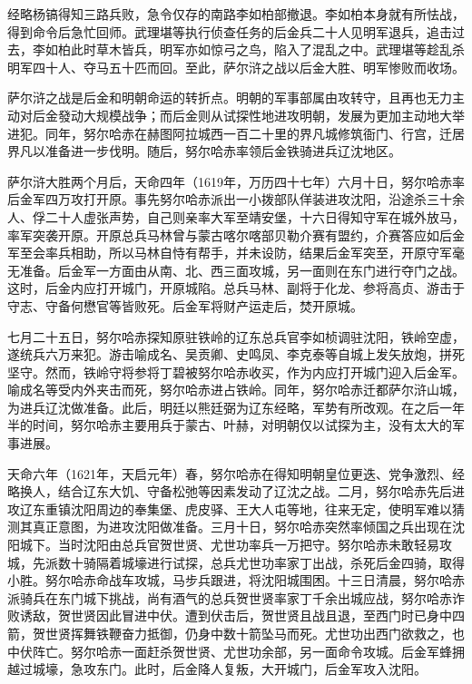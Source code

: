经略杨镐得知三路兵败，急令仅存的南路李如柏部撤退。李如柏本身就有所怯战，得到命令后急忙回师。武理堪等执行侦查任务的后金兵二十人见明军退兵，追击过去，李如柏此时草木皆兵，明军亦如惊弓之鸟，陷入了混乱之中。武理堪等趁乱杀明军四十人、夺马五十匹而回。至此，萨尔浒之战以后金大胜、明军惨败而收场。

萨尔浒之战是后金和明朝命运的转折点。明朝的军事部属由攻转守，且再也无力主动对后金發动大规模战争；而后金则从试探性地进攻明朝，发展为更加主动地大举进犯。同年，努尔哈赤在赫图阿拉城西一百二十里的界凡城修筑衙门、行宫，迁居界凡以准备进一步伐明。随后，努尔哈赤率领后金铁骑进兵辽沈地区。

萨尔浒大胜两个月后，天命四年（1619年，万历四十七年）六月十日，努尔哈赤率后金军四万攻打开原。事先努尔哈赤派出一小拨部队佯装进攻沈阳，沿途杀三十余人、俘二十人虚张声势，自己则亲率大军至靖安堡，十六日得知守军在城外放马，率军突袭开原。开原总兵马林曾与蒙古喀尔喀部贝勒介赛有盟约，介赛答应如后金军至会率兵相助，所以马林自恃有帮手，并未设防，结果后金军突至，开原守军毫无准备。后金军一方面由从南、北、西三面攻城，另一面则在东门进行夺门之战。这时，后金内应打开城门，开原城陷。总兵马林、副将于化龙、参将高贞、游击于守志、守备何懋官等皆败死。后金军将财产运走后，焚开原城。

七月二十五日，努尔哈赤探知原驻铁岭的辽东总兵官李如桢调驻沈阳，铁岭空虚，遂统兵六万来犯。游击喻成名、吴贡卿、史鸣凤、李克泰等自城上发矢放炮，拼死坚守。然而，铁岭守将参将丁碧被努尔哈赤收买，作为内应打开城门迎入后金军。喻成名等受内外夹击而死，努尔哈赤进占铁岭。同年，努尔哈赤迁都萨尔浒山城，为进兵辽沈做准备。此后，明廷以熊廷弼为辽东经略，军势有所改观。在之后一年半的时间，努尔哈赤主要用兵于蒙古、叶赫，对明朝仅以试探为主，没有太大的军事进展。

天命六年（1621年，天启元年）春，努尔哈赤在得知明朝皇位更迭、党争激烈、经略换人，结合辽东大饥、守备松弛等因素发动了辽沈之战。二月，努尔哈赤先后进攻辽东重镇沈阳周边的奉集堡、虎皮驿、王大人屯等地，往来无定，使明军难以猜测其真正意图，为进攻沈阳做准备。三月十日，努尔哈赤突然率倾国之兵出现在沈阳城下。当时沈阳由总兵官贺世贤、尤世功率兵一万把守。努尔哈赤未敢轻易攻城，先派数十骑隔着城壕进行试探，总兵尤世功率家丁出战，杀死后金四骑，取得小胜。努尔哈赤命战车攻城，马步兵跟进，将沈阳城围困。十三日清晨，努尔哈赤派骑兵在东门城下挑战，尚有酒气的总兵贺世贤率家丁千余出城应战，努尔哈赤诈败诱敌，贺世贤因此冒进中伏。遭到伏击后，贺世贤且战且退，至西门时已身中四箭，贺世贤挥舞铁鞭奋力抵御，仍身中数十箭坠马而死。尤世功出西门欲救之，也中伏阵亡。努尔哈赤一面赶杀贺世贤、尤世功余部，另一面命令攻城。后金军蜂拥越过城壕，急攻东门。此时，后金降人复叛，大开城门，后金军攻入沈阳。

